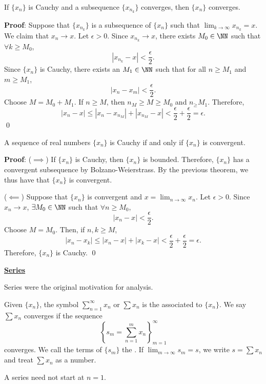 \begin{theorem}
If $\{x_n\}$ is Cauchy and a subsequence $\{x_{n_k}\}$ converges, then $\{x_n\}$ converges.
\end{theorem}
\textbf{Proof}: Suppose that $\{x_{n_k}\}$ is a subsequence of $\{x_n\}$ such that $\lim_{k\to \infty} x_{n_k} =x$. We claim that $x_n \to x$. Let $\epsilon>0$. Since $x_{n_k}\to x$, there exists $M_0 \in \NN$ such that $\forall k \geq M_0$, 
\[
|x_{n_k} - x| < \frac{\epsilon}{2}.
\]
Since $\{x_n\}$ is Cauchy, there exists an $M_1 \in \NN$ such that for all $n \geq M_1$ and $m\geq M_1$, 
\[
|x_n-x_m|<\frac{\epsilon}{2}.
\]
Choose $M = M_0 + M_1$. If $n\geq M$, then $n_M \geq M \geq M_0$ and $n_ \geq M_1$. Therefore, 
\[
|x_n-x| \leq |x_n -x_{n_M}| + |x_{n_M} - x| < \frac{\epsilon}{2}+ \frac{\epsilon}{2} = \epsilon.
\] 
\qed 

\begin{theorem}
A sequence of real numbers $\{x_n\}$ is Cauchy if and only if $\{x_n\}$ is convergent.
\end{theorem}
\textbf{Proof}: ($\implies$) If $\{x_n\}$ is Cauchy, then $\{x_n\}$ is bounded. Therefore, $\{x_n\}$ has a convergent subsequence by Bolzano-Weierstrass. By the previous theorem, we thus have that $\{x_n\}$ is convergent.

($\impliedby$) Suppose that $\{x_n\}$ is convergent and $x = \lim_{n\to \infty} x_n$. Let $\epsilon>0$. Since $x_n \to x$, $\exists M_0 \in \NN$ such that $\forall n\geq M_0$,
\[
|x_n-x| < \frac{\epsilon}{2}.
\]
Choose $M = M_0$. Then, if $n,k\geq M$,
\[
|x_n -x_k| \leq |x_n-x| + |x_k-x| < \frac{\epsilon}{2} + \frac{\epsilon}{2} = \epsilon.
\]
Therefore, $\{x_n\}$ is Cauchy. \qed 

\noindent\underline{\textbf{Series}}
\begin{remark}
Series were the original motivation for analysis.
\end{remark}
\begin{definition}
Given $\{x_n\}$, the symbol $\sum_{n=1}^\infty x_n$ or $\sum x_n$ is the  associated to $\{x_n\}$. We say $\sum x_n$ converges if the sequence 
\[
\left\{
s_m = \sum_{n=1}^m x_n
\right\}_{m=1}^\infty
\]
converges. We call the terms of $\{s_m\}$ the . If $\lim_{m\to \infty} s_m = s$, we write $s = \sum x_n$ and treat $\sum x_n$ as a number.
\end{definition}

\begin{remark} A series need not start at $n=1$.
\end{remark}

